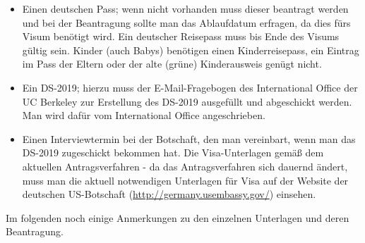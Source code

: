 \documentclass[a4paper]{scrreprt}
\begin{document}
\begin{itemize}

  \item Einen deutschen Pass; wenn nicht vorhanden muss dieser beantragt werden und bei der Beantragung sollte man das Ablaufdatum erfragen, da dies fürs Visum benötigt wird. Ein deutscher Reisepass muss bis Ende des Visums gültig sein. Kinder (auch Babys) benötigen einen Kinderreisepass, ein Eintrag im Pass der Eltern oder der alte (grüne) Kinderausweis genügt nicht.

	\item Ein DS-2019; hierzu muss der E-Mail-Fragebogen des International Office der UC Berkeley zur Erstellung des DS-2019 ausgefüllt und abgeschickt werden. Man wird dafür vom International Office angeschrieben.
	
	\item Einen Interviewtermin bei der Botschaft, den man vereinbart, wenn man das DS-2019 zugeschickt bekommen hat. Die Visa-Unterlagen gemäß dem aktuellen Antragsverfahren - da das Antragsverfahren sich dauernd ändert, muss man die aktuell notwendigen Unterlagen für Visa auf der Website der deutschen US-Botschaft (\url{http://germany.usembassy.gov/}) einsehen.

\end{itemize}

Im folgenden noch einige Anmerkungen zu den einzelnen Unterlagen und deren Beantragung.
\end{document}
